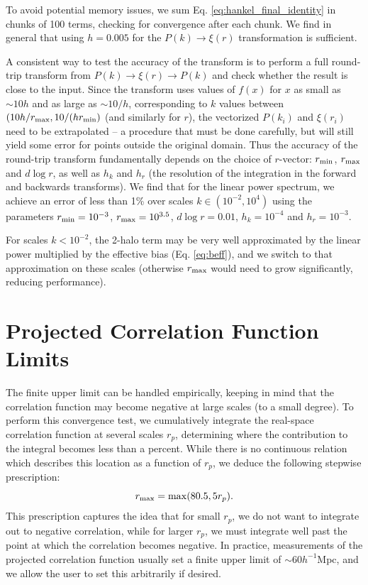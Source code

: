 \documentclass[5p]{elsarticle}
\begin{document}
 To avoid potential memory issues, we sum Eq. \ref{eq:hankel_final_identity} in chunks of 100 terms, checking for convergence after each chunk.
 We find in general that using $h=0.005$ for the $P(k) \rightarrow \xi(r)$ transformation is sufficient. 
 
 A consistent way to test the accuracy of the transform is to perform a full round-trip transform from $P(k) \rightarrow \xi(r) \rightarrow P(k)$ and check whether the result is close to the input.
 Since the transform uses values of $f(x)$ for $x$ as small as $\sim 10h$ and as large as $\sim 10/h$, corresponding to $k$ values between $(10 h / r_{\rm max}, 10/(h r_{\rm min})$ (and similarly for $r$),
 the vectorized $P(k_i)$ and $\xi(r_i)$ need to be extrapolated -- a procedure that must be done carefully, but will still yield some error for points outside the original domain.
 Thus the accuracy of the round-trip transform fundamentally depends on the choice of $r$-vector: $r_{\rm min}$, $r_{\rm max}$ and $d\log r$, as well as $h_k$ and $h_r$ (the resolution of the integration in the forward and backwards transforms). 
 We find that for the linear power spectrum, we achieve an error of less than 1\% over scales $k \in (10^{-2}, 10^4)$ using the parameters $r_{\rm min} = 10^{-3}$, $r_{\rm max} = 10^{3.5}$, $d\log r = 0.01$, $h_k = 10^{-4}$ and $h_r = 10^{-3}$.
 
 For scales $k < 10^{-2}$, the 2-halo term may be very well approximated by the linear power multiplied by the effective bias (Eq. \ref{eq:beff}), and we switch to that approximation on these scales (otherwise $r_{\rm max}$ would need to grow significantly, reducing performance).
 

\section{Projected Correlation Function Limits}
\label{app:proj}
The finite upper limit can be handled empirically, keeping in mind that the correlation function may become negative at large scales (to a small degree). 
To perform this convergence test, we cumulatively integrate the real-space correlation function at several scales $r_p$, determining where the contribution to the integral becomes less than a percent. 
While there is no continuous relation which describes this location as a function of $r_p$, we deduce the following stepwise prescription:
\begin{equation}
	r_{\rm max} = {\rm max}(80.5,5r_p).
\end{equation}
This prescription captures the idea that for small $r_p$, we do not want to integrate out to negative correlation, while for larger $r_p$, we must integrate well past the point at which the correlation becomes negative. In practice, measurements of the projected correlation function usually set a finite upper limit of $\sim 60 h^{-1}$Mpc, and we allow the user to set this arbitrarily if desired.
\end{document}
